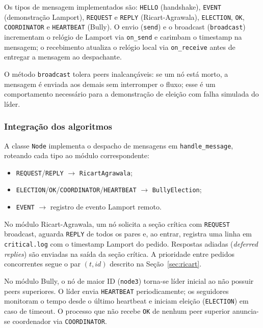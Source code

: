 \documentclass[10pt, a4paper, titlepage]{extarticle}
\begin{document}
Os tipos de mensagem implementados são: \texttt{HELLO} (handshake), \texttt{EVENT} (demonstração Lamport), \texttt{REQUEST} e \texttt{REPLY} (Ricart-Agrawala), \texttt{ELECTION}, \texttt{OK}, \texttt{COORDINATOR} e \texttt{HEARTBEAT} (Bully). O envio (\texttt{send}) e o broadcast (\texttt{broadcast}) incrementam o relógio de Lamport via \texttt{on\_send} e carimbam o timestamp na mensagem; o recebimento atualiza o relógio local via \texttt{on\_receive} antes de entregar a mensagem ao despachante.

O método \texttt{broadcast} tolera peers inalcançáveis: se um nó está morto, a mensagem é enviada aos demais sem interromper o fluxo; esse é um comportamento necessário para a demonstração de eleição com falha simulada do líder.

\subsubsection{Integração dos algoritmos}
A classe \texttt{Node} implementa o despacho de mensagens em \texttt{handle\_message}, roteando cada tipo ao módulo correspondente:

\begin{itemize}
  \item \texttt{REQUEST}/\texttt{REPLY} $\rightarrow$ \texttt{RicartAgrawala};
  \item \texttt{ELECTION}/\texttt{OK}/\texttt{COORDINATOR}/\texttt{HEARTBEAT} $\rightarrow$ \texttt{BullyElection};
  \item \texttt{EVENT} $\rightarrow$ registro de evento Lamport remoto.
\end{itemize}

No módulo Ricart-Agrawala, um nó solicita a seção crítica com \texttt{REQUEST} broadcast, aguarda \texttt{REPLY} de todos os pares e, ao entrar, registra uma linha em \texttt{critical.log} com o timestamp Lamport do pedido. Respostas adiadas (\emph{deferred replies}) são enviadas na saída da seção crítica. A prioridade entre pedidos concorrentes segue o par $(t, \mathit{id})$ descrito na Seção~\ref{sec:ricart}.

No módulo Bully, o nó de maior ID (\texttt{node3}) torna-se líder inicial ao não possuir peers superiores. O líder envia \texttt{HEARTBEAT} periodicamente; os seguidores monitoram o tempo desde o último heartbeat e iniciam eleição (\texttt{ELECTION}) em caso de timeout. O processo que não recebe \texttt{OK} de nenhum peer superior anuncia-se coordenador via \texttt{COORDINATOR}.
\end{document}
